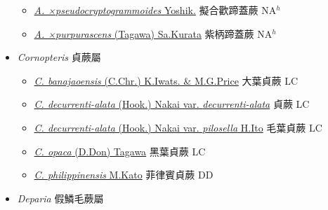\begin{itemize}
\begin{itemize}
        \item[] \href{http://www.theplantlist.org/tpl1.1/search?q=Athyrium+×pseudocryptogrammoides}{\textit{A. ×pseudocryptogrammoides} Yoshik.}   擬合歡蹄蓋蕨 NA$^h$
        \item[] \href{http://www.theplantlist.org/tpl1.1/search?q=Athyrium+×purpurascens}{\textit{A. ×purpurascens} (Tagawa) Sa.Kurata}   紫柄蹄蓋蕨 NA$^h$
  \end{itemize}
 \item[] \textit{Cornopteris} 貞蕨屬
                    
  \begin{itemize}
        \item[] \href{http://www.theplantlist.org/tpl1.1/search?q=Cornopteris+banajaoensis}{\textit{C. banajaoensis} (C.Chr.) K.Iwats. \& M.G.Price}     大葉貞蕨 LC
        \item[] \href{http://www.theplantlist.org/tpl1.1/search?q=Cornopteris+decurrenti-alata+var.+decurrenti-alata}{\textit{C. decurrenti-alata} (Hook.) Nakai var. \textit{decurrenti-alata}}   貞蕨 LC
        \item[] \href{http://www.theplantlist.org/tpl1.1/search?q=Cornopteris+decurrenti-alata+var.+pilosella}{\textit{C. decurrenti-alata} (Hook.) Nakai var. \textit{pilosella} H.Ito}   毛葉貞蕨 LC
        \item[] \href{http://www.theplantlist.org/tpl1.1/search?q=Cornopteris+opaca}{\textit{C. opaca} (D.Don) Tagawa}   黑葉貞蕨 LC
        \item[] \href{http://www.theplantlist.org/tpl1.1/search?q=Cornopteris+philippinensis}{\textit{C. philippinensis} M.Kato}   菲律賓貞蕨 DD
  \end{itemize}
 \item[] \textit{Deparia} 假鱗毛蕨屬
                    

\end{itemize}
